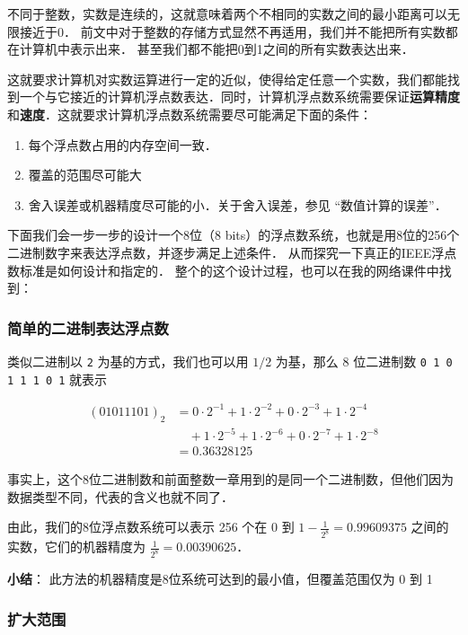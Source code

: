 不同于整数，实数是连续的，这就意味着两个不相同的实数之间的最小距离可以无限接近于0． 前文中对于整数的存储方式显然不再适用，我们并不能把所有实数都在计算机中表示出来． 甚至我们都不能把0到1之间的所有实数表达出来．

这就要求计算机对实数运算进行一定的近似，使得给定任意一个实数，我们都能找到一个与它接近的计算机浮点数表达．同时，计算机浮点数系统需要保证\textbf{运算精度}和\textbf{速度}．这就要求计算机浮点数系统需要尽可能满足下面的条件：

\begin{enumerate}
\item 每个浮点数占用的内存空间一致．
\item 覆盖的范围尽可能大
\item 舍入误差或机器精度尽可能的小．关于舍入误差，参见 “数值计算的误差”．
\end{enumerate}

下面我们会一步一步的设计一个8位（8 bits）的浮点数系统，也就是用8位的256个二进制数字来表达浮点数，并逐步满足上述条件． 从而探究一下真正的IEEE浮点数标准是如何设计和指定的． 整个的这个设计过程，也可以在我的网络课件中找到：

\subsubsection{简单的二进制表达浮点数}

类似二进制以 \verb|2| 为基的方式，我们也可以用 $1/2$ 为基，那么 8 位二进制数 \verb|0 1 0 1 1 1 0 1| 就表示

\begin{equation}
\begin{aligned}
(01011101)_2 &= 0\cdot2^{-1}+1\cdot2^{-2}+0\cdot2^{-3}+1\cdot2^{-4}\\
 &\quad +1\cdot2^{-5}+1\cdot2^{-6}+0\cdot2^{-7}+1\cdot2^{-8}\\
 &= 0.36328125
\end{aligned}
\end{equation}

事实上，这个8位二进制数和前面整数一章用到的是同一个二进制数，但他们因为数据类型不同，代表的含义也就不同了．

由此，我们的8位浮点数系统可以表示 256 个在 0 到  $1-\frac{1}{2^8}=0.99609375$  之间的实数，它们的机器精度为  $\frac{1}{2^8}=0.00390625$．

\textbf{小结}： 此方法的机器精度是8位系统可达到的最小值，但覆盖范围仅为 0 到 1

\subsubsection{扩大范围}

